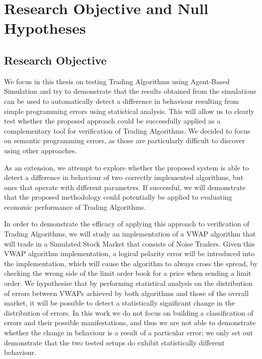 \section{Research Objective and Null Hypotheses}
\label{Chapters/Introduction/Research-Objective-and-Null-Hypotheses}

\subsection{Research Objective}
We focus in this thesis on testing Trading Algorithms using Agent-Based Simulation and try to demonstrate that the results obtained from the simulations can be used to automatically detect a difference in behaviour resulting from simple programming errors using statistical analysis. This will allow us to clearly test whether the proposed approach could be successfully applied as a complementary tool for verification of Trading Algorithms. We decided to focus on semantic programming errors, as those are particularly difficult to discover using other approaches. 

As an extension, we attempt to explore whether the proposed system is able to detect a difference in behaviour of two correctly implemented algorithms, but ones that operate with different parameters. If successful, we will demonstrate that the proposed methodology could potentially be applied to evaluating economic performance of Trading Algorithms.

In order to demonstrate the efficacy of applying this approach to verification of Trading Algorithms, we will study an implementation of a VWAP algorithm that will trade in a Simulated Stock Market that consists of Noise Traders. Given this VWAP algorithm implementation, a logical polarity error will be introduced into the implementation, which will cause the algorithm to always cross the spread, by checking the wrong side of the limit order book for a price when sending a limit order. We hypothesise that by performing statistical analysis on the distribution of errors between VWAPs achieved by both algorithms and those of the overall market, it will be possible to detect a statistically significant change in the distribution of errors. In this work we do not focus on building a classification of errors and their possible manifestations, and thus we are not able to demonstrate whether the change in behaviour is a result of a particular error; we only set out demonstrate that the two tested setups do exhibit statistically different behaviour. 

